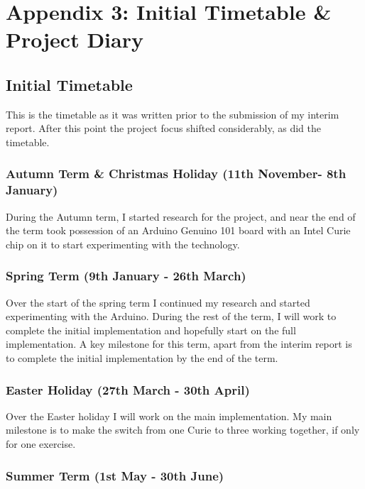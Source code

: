 \documentclass[a4paper]{article}
\begin{document}
\newpage
\section{Appendix 3: Initial Timetable \& Project Diary}
\label{sec:a3}

\subsection{Initial Timetable}%
\label{subsec:a3_it}

This is the timetable as it was written prior to the submission of my interim report. After this point the project focus shifted considerably, as did the timetable.

\subsubsection{Autumn Term \& Christmas Holiday (11th November- 8th January)}

During the Autumn term, I started research for the project, and near the end of the term took possession of an Arduino Genuino 101 board with an Intel Curie chip on it to start experimenting with the technology.

\subsubsection{Spring Term (9th January - 26th March)}

Over the start of the spring term I continued my research and started experimenting with the Arduino. During the rest of the term, I will work to complete the initial implementation and hopefully start on the full implementation. A key milestone for this term, apart from the interim report is to complete the initial implementation by the end of the term.

\subsubsection{Easter Holiday (27th March - 30th April)}

Over the Easter holiday I will work on the main implementation. My main milestone is to make the switch from one Curie to three working together, if only for one exercise. 

\subsubsection{Summer Term (1st May - 30th June)}
\end{document}
